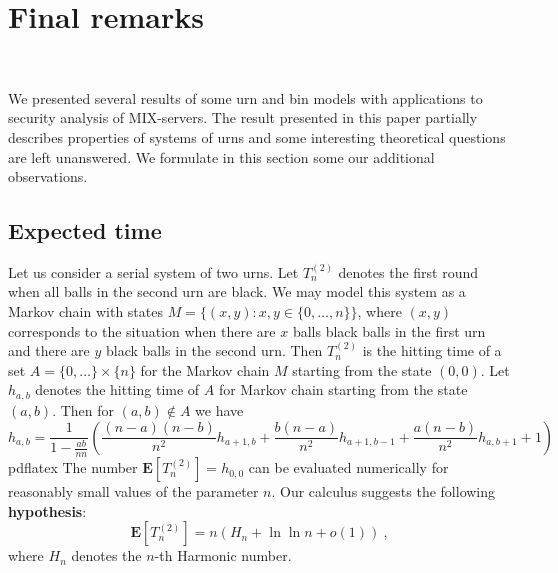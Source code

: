\documentclass[submission]{dmtcs}
\newcommand{\E}[1]{\mathbf{E}\left[#1\right]}
\newcommand{\Marek} [1]{\marginpar{\scriptsize {\bf MKlo}:#1}}
\begin{document}
\section{Final remarks}~\label{Con}
\label{sec:FinalRemarks}

We presented several results of some urn and bin models with applications to security analysis of MIX-servers. 
The result presented in this paper partially describes properties of systems of urns  and some interesting theoretical questions are left unanswered.  We formulate in this section some our additional observations. 


\subsection{Expected time}

Let us consider a serial system of two urns. 
Let $T_n^{(2)}$ denotes the first round 
when all balls in the second urn are black. 
We may model  this system as a Markov chain with states 
$M = \{(x,y):x,y \in \{0,\ldots,n\}\}$, where $(x,y)$ corresponds to the 
situation when there are $x$ balls black balls in the first urn 
and there are $y$ black balls in the second urn. Then
$T_n^{(2)}$ is the hitting time of a set $A = \{0,\ldots\}\times \{n\}$  for the
Markov chain $M$ starting from the state $(0,0)$.
Let $h_{a,b}$ denotes the hitting time of $A$ for Markov chain starting 
from the state $(a,b)$. Then for $(a,b) \notin A$ we have
$$
h_{a,b} = 
\frac{1}{1-\frac{a b}{n n}}
\left(\frac{(n-a) (n-b)}{n^2}  h_{a+1,b} +
\frac{b (n-a)}{n^2}  h_{a+1,b-1} +
\frac{a (n-b)}{n^2}  h_{a,b+1}+
1\right)
$$
pdflatex
The number $\E{T_n^{(2)}} = h_{0,0}$ can be evaluated numerically for reasonably small 
values of the parameter $n$. Our calculus suggests the following 
\textbf{hypothesis}:
$$
  \E{T_n^{(2)}} = n(H_n + \ln\ln n + o(1))~,
$$
where $H_n$ denotes the $n$-th Harmonic number. 
\end{document}
